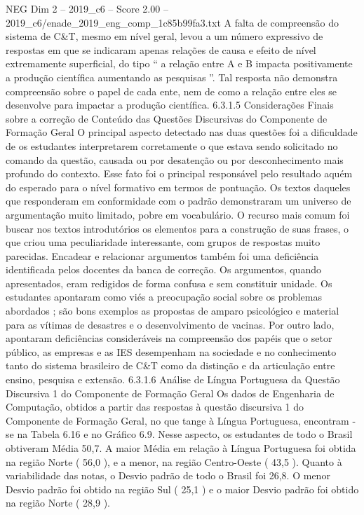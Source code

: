 \begin{textsample}{NEG Dim 2 – 2019\_c6 – Score 2.00 – 2019\_c6/enade\_2019\_eng\_comp\_1c85b99fa3.txt}
A falta de compreensão do sistema de C\&T, mesmo em nível geral, levou a um número expressivo de respostas em que se indicaram apenas relações de causa e efeito de nível extremamente superficial, do tipo “ a relação entre A e B impacta positivamente a produção científica aumentando as pesquisas ”.
Tal resposta não demonstra compreensão sobre o papel de cada ente, nem de como a relação entre eles se desenvolve para impactar a produção científica. 6.3.1.5 Considerações Finais sobre a correção de Conteúdo das Questões Discursivas do Componente de Formação Geral O principal aspecto detectado nas duas questões foi a dificuldade de os estudantes interpretarem corretamente o que estava sendo solicitado no comando da questão, causada ou por desatenção ou por desconhecimento mais profundo do contexto.
Esse fato foi o principal responsável pelo resultado aquém do esperado para o nível formativo em termos de pontuação.
Os textos daqueles que responderam em conformidade com o padrão demonstraram um universo de argumentação muito limitado, pobre em vocabulário.
O recurso mais comum foi buscar nos textos introdutórios os elementos para a construção de suas frases, o que criou uma peculiaridade interessante, com grupos de respostas muito parecidas.
Encadear e relacionar argumentos também foi uma deficiência identificada pelos docentes da banca de correção.
Os argumentos, quando apresentados, eram redigidos de forma confusa e sem constituir unidade.
Os estudantes apontaram como viés a preocupação social sobre os problemas abordados ; são bons exemplos as propostas de amparo psicológico e material para as vítimas de desastres e o desenvolvimento de vacinas.
Por outro lado, apontaram deficiências consideráveis na compreensão dos papéis que o setor público, as empresas e as IES desempenham na sociedade e no conhecimento tanto do sistema brasileiro de C\&T como da distinção e da articulação entre ensino, pesquisa e extensão. 6.3.1.6 Análise de Língua Portuguesa da Questão Discursiva 1 do Componente de Formação Geral Os dados de Engenharia de Computação, obtidos a partir das respostas à questão discursiva 1 do Componente de Formação Geral, no que tange à Língua Portuguesa, encontram -se na Tabela 6.16 e no Gráfico 6.9.
Nesse aspecto, os estudantes de todo o Brasil obtiveram Média 50,7.
A maior Média em relação à Língua Portuguesa foi obtida na região Norte ( 56,0 ), e a menor, na região Centro-Oeste ( 43,5 ).
Quanto à variabilidade das notas, o Desvio padrão de todo o Brasil foi 26,8.
O menor Desvio padrão foi obtido na região Sul ( 25,1 ) e o maior Desvio padrão foi obtido na região Norte ( 28,9 ).

\end{textsample}
